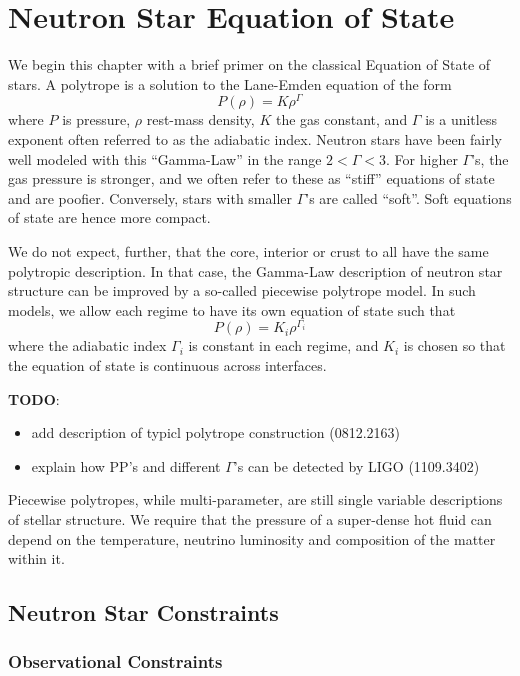 \chapter{Neutron Star Equation of State}
\label{chap:chapter-2}

We begin this chapter with a brief primer on the classical Equation of State of stars.
A polytrope is a solution to the Lane-Emden equation of the form
$$P(\rho) = K \rho^\Gamma$$
where $P$ is pressure, $\rho$ rest-mass density, $K$ the gas constant, and $\Gamma$ is a unitless exponent often referred to as the adiabatic index.
Neutron stars have been fairly well modeled with this ``Gamma-Law'' in the range $2 < \Gamma < 3$.
For higher $\Gamma$'s, the gas pressure is stronger, and we often refer to these as ``stiff'' equations of state and are poofier.
Conversely, stars with smaller $\Gamma$'s are called ``soft''.  Soft equations of state are hence more compact.

We do not expect, further, that the core, interior or crust to all have the same polytropic description.
In that case, the Gamma-Law description of neutron star structure can be improved by a so-called piecewise polytrope model.
In such models, we allow each regime to have its own equation of state such that 
$$P(\rho) = K_i \rho^{\Gamma_i}$$
where the adiabatic index $\Gamma_i$ is constant in each regime, and $K_i$ is chosen so that the equation of state is continuous across interfaces.

\textbf{TODO}: 
\begin{itemize}
	\item add description of typicl polytrope construction  (0812.2163)
	\item explain how PP's and different $\Gamma$'s can be detected by LIGO (1109.3402)
\end{itemize}

Piecewise polytropes, while multi-parameter, are still single variable descriptions of stellar structure.  We require that the pressure of a super-dense hot fluid can depend on the temperature, neutrino luminosity and composition of the matter within it.

\section{Neutron Star Constraints}

\subsection{Observational Constraints}

